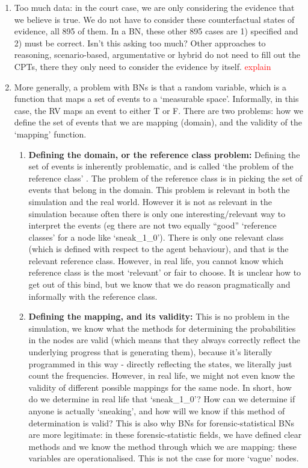 \documentclass[12pt]{article}
\begin{document}
\begin{enumerate}
\item Too much data: in the court case, we are only considering the evidence that we believe is true. We do not have to consider these counterfactual states of evidence, all 895 of them. In a BN, these other 895 cases are 1) specified and 2) must be correct. Isn't this asking too much? Other approaches to reasoning, scenario-based, argumentative or hybrid do not need to fill out the CPTs, there they only need to consider the evidence by itself.  \textcolor{red} {explain}



\item More generally, a problem with BNs is that a random variable, which is a function that maps a set of events to a `measurable space'. Informally, in this case, the RV maps an event to either T or F. There are two problems: how we define the set of events that we are mapping (domain), and the validity of the `mapping' function.

\begin{enumerate}
\item \textbf{Defining the domain, or the reference class problem:} Defining the set of events is inherently problematic, and is called `the problem of the reference class' \citep{colyvan2001}. The problem of the reference class is in picking the set of events that belong in the domain. This problem is relevant in both the simulation and the real world.  However it is not as relevant in the simulation because often there is only one interesting/relevant way to interpret the events (eg there are not two equally ``good'' `reference classes' for a node like `sneak\_1\_0'). There is only one relevant class (which is defined with respect to the agent behaviour), and that is the relevant reference class. However, in real life, you cannot know which reference class is the most `relevant' or fair to choose. It is unclear how to get out of this bind, but we know that we do reason pragmatically and informally with the reference class.
\item \textbf{Defining the mapping, and its validity:} This is no problem in the simulation, we know what the methods for determining the probabilities in the nodes are valid (which means that they always correctly reflect the underlying progress that is generating them), because it's literally programmed in this way - directly reflecting the states, we literally just count the frequencies. However, in real life, we might not even know the validity of different possible mappings for the same node. In short, how do we determine in real life that `sneak\_1\_0'? How can we determine if anyone is actually `sneaking', and how will we know if this method of determination is valid? This is also why BNs for forensic-statistical BNs are more legitimate: in these forensic-statistic fields, we have defined clear methods and we know the method through which we are mapping: these variables are operationalised. This is not the case for more `vague' nodes.
\end{enumerate}
\end{enumerate}
\end{document}

